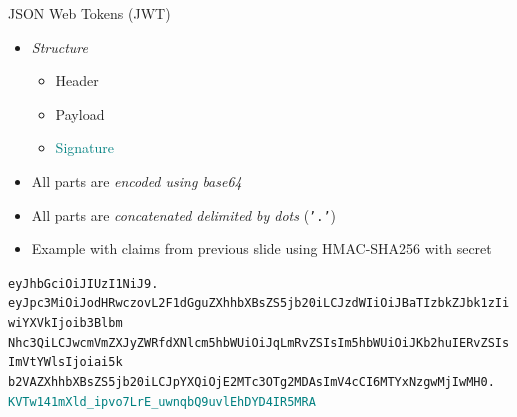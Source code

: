 \documentclass[aspectratio=169]{beamer}
\begin{document}
\begin{frame}{JSON Web Tokens (JWT)}
	\begin{itemize}
		\item \emph{Structure}
		\begin{itemize}
			\item \textcolor<2>{ed-blue}{Header} \hfill {}
			\item \textcolor<2>{ed-pink}{Payload} \hfill {}
			\item \textcolor<2>{teal}{Signature} \hfill {}
		\end{itemize}
		\item All parts are \emph{encoded using base64}
		\item All parts are \emph{concatenated delimited by dots} (\texttt{'.'})
		\item Example with claims from previous slide using HMAC-SHA256 with secret 
	\end{itemize}

	\pause

	\begin{center}
		\footnotesize
		\texttt{\textcolor{ed-blue}{eyJhbGciOiJIUzI1NiJ9}.} \\
		\texttt{\textcolor{ed-pink}{eyJpc3MiOiJodHRwczovL2F1dGguZXhhbXBsZS5jb20iLCJzdWIiOiJBaTIzbkZJbk1zIiwiYXVkIjoib3Blbm\\Nhc3QiLCJwcmVmZXJyZWRfdXNlcm5hbWUiOiJqLmRvZSIsIm5hbWUiOiJKb2huIERvZSIsImVtYWlsIjoiai5k\\b2VAZXhhbXBsZS5jb20iLCJpYXQiOjE2MTc3OTg2MDAsImV4cCI6MTYxNzgwMjIwMH0}.} \\
		\texttt{\textcolor{teal}{KVTw141mXld\_ipvo7LrE\_uwnqbQ9uvlEhDYD4IR5MRA}}
	\end{center}

\end{frame}
\end{document}
